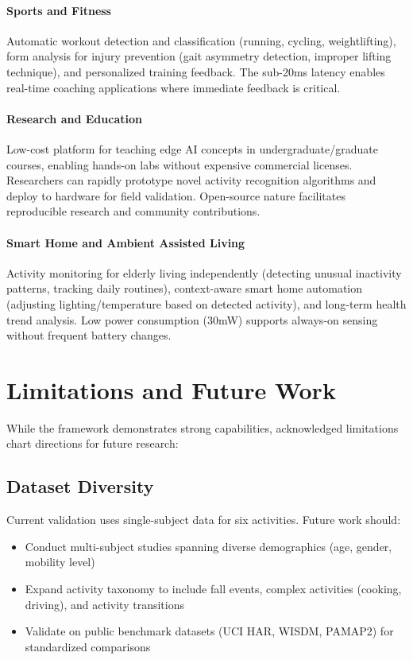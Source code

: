 \paragraph{Sports and Fitness}
Automatic workout detection and classification (running, cycling, weightlifting), form analysis for injury prevention (gait asymmetry detection, improper lifting technique), and personalized training feedback. The sub-20ms latency enables real-time coaching applications where immediate feedback is critical.

\paragraph{Research and Education}
Low-cost platform for teaching edge AI concepts in undergraduate/graduate courses, enabling hands-on labs without expensive commercial licenses. Researchers can rapidly prototype novel activity recognition algorithms and deploy to hardware for field validation. Open-source nature facilitates reproducible research and community contributions.

\paragraph{Smart Home and Ambient Assisted Living}
Activity monitoring for elderly living independently (detecting unusual inactivity patterns, tracking daily routines), context-aware smart home automation (adjusting lighting/temperature based on detected activity), and long-term health trend analysis. Low power consumption (30mW) supports always-on sensing without frequent battery changes.

\section{Limitations and Future Work}

While the framework demonstrates strong capabilities, acknowledged limitations chart directions for future research:

\subsection{Dataset Diversity}
Current validation uses single-subject data for six activities. Future work should:
\begin{itemize}
    \item Conduct multi-subject studies spanning diverse demographics (age, gender, mobility level)
    \item Expand activity taxonomy to include fall events, complex activities (cooking, driving), and activity transitions
    \item Validate on public benchmark datasets (UCI HAR, WISDM, PAMAP2) for standardized comparisons
\end{itemize}

